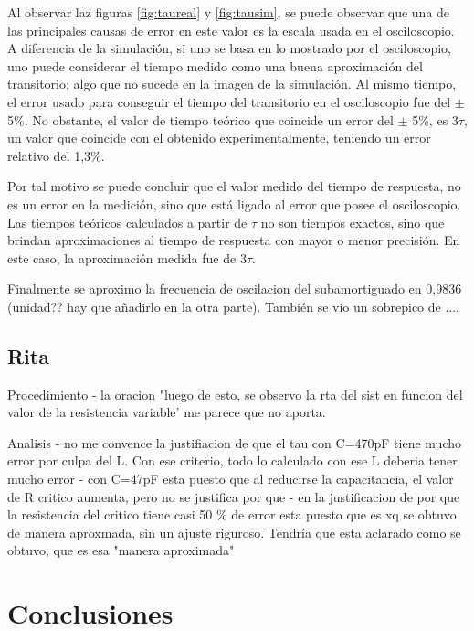 \documentclass{article}
\begin{document}
   
   Al observar laz figuras \ref{fig:taureal} y \ref{fig:tausim}, se puede observar que una de las principales causas de error en este valor es la escala usada en el osciloscopio. A diferencia de la simulación, si uno se basa en lo mostrado por el osciloscopio, uno puede considerar el tiempo medido como una buena aproximación del transitorio; algo que no sucede en la imagen de la simulación. Al mismo tiempo, el error usado para conseguir el tiempo del transitorio en el osciloscopio fue del $\pm$ 5\%. No obstante, el valor de tiempo teórico que coincide un error del $\pm$ 5\%, es 3$\tau$, un valor que coincide con el obtenido experimentalmente, teniendo un error relativo del 1,3\%. \par
    Por tal motivo se puede concluir que el valor medido del tiempo de respuesta, no es un error en la medición, sino que está ligado al error que posee el osciloscopio. Las tiempos teóricos calculados a partir de $\tau$ no son tiempos exactos, sino que brindan aproximaciones al tiempo de respuesta con mayor o menor precisión. En este caso, la aproximación medida fue de $3\tau$.
    
    Finalmente se aproximo la frecuencia de oscilacion del subamortiguado en 0,9836 (unidad?? hay que añadirlo en la otra parte). También se vio un sobrepico de ....
    
    
    
    
   
   
        
        

\subsection*{Rita}
Procedimiento
- la oracion "luego de esto, se observo la rta del sist en funcion del valor de la resistencia variable' me parece que no aporta.


Analisis
- no me convence la justifiacion de que el tau con C=470pF tiene mucho error por culpa del L. Con ese criterio, todo lo calculado con ese L deberia tener mucho error
- con C=47pF esta puesto que al reducirse la capacitancia, el valor de R critico aumenta, pero no se justifica por que
- en la justificacion de por que la resistencia del critico tiene casi 50 \% de error esta puesto que es xq se obtuvo de manera aproxmada, sin un ajuste riguroso. Tendría que esta aclarado como se obtuvo, que es esa "manera aproximada"



\section{Conclusiones}
\end{document}
